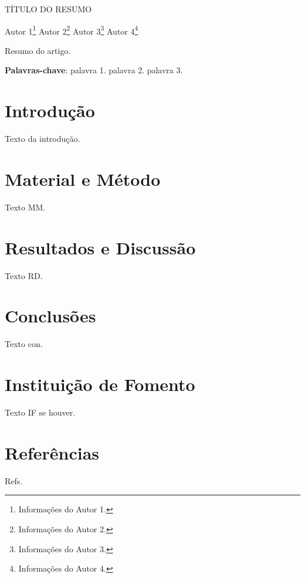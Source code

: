 \documentclass[article,12pt,onesidea,4paper,english,brazil]{abntex2}
\begin{document}
	
	
	\frenchspacing 
	
	\begin{center}
		\LARGE TÍTULO DO RESUMO
		
		\normalsize
		Autor 1\footnote{Informações do Autor 1.} 
		Autor 2\footnote{Informações do Autor 2.} 
		Autor 3\footnote{Informações do Autor 3.} 
		Autor 4\footnote{Informações do Autor 4.} 
	\end{center}
	
	\begin{resumoumacoluna}
		Resumo do artigo.
		
		\vspace{\onelineskip}
		
		\noindent
		\textbf{Palavras-chave}: palavra 1. palavra 2. palavra 3.
	\end{resumoumacoluna}
	
	\textual
	
	\section*{Introdução}
	
	Texto da introdução.
	
	\section*{Material e Método}
	
	Texto MM.
	
	\section*{Resultados e Discussão}
	
	Texto RD.
	
	\section*{Conclusões}
	
	Texto con.
	
	\section*{Instituição de Fomento}
	
	Texto IF se houver.
	
	\section*{Referências}
	
	Refs.
	
\end{document}
